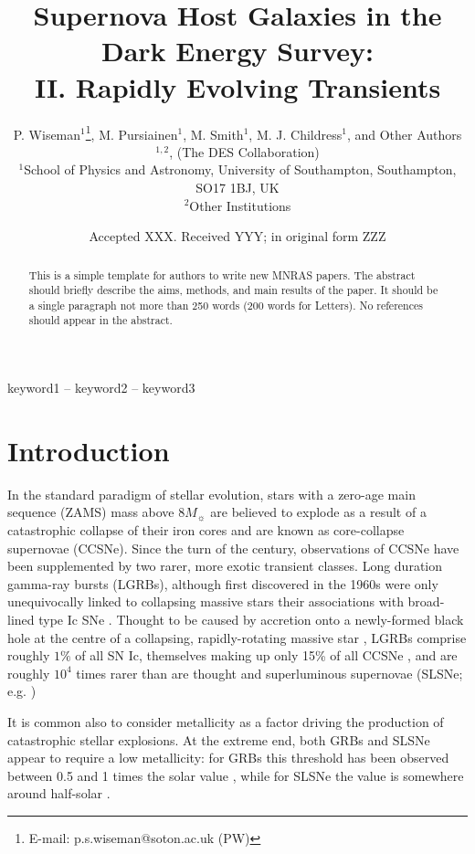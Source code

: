 \documentclass[fleqn,usenatbib,]{mnras}
\title[Supernova hosts in DES]{Supernova Host Galaxies in the Dark Energy Survey: \\ II. Rapidly Evolving Transients}
\author[P. Wiseman et al.]{
P. Wiseman$^1$\thanks{E-mail: p.s.wiseman@soton.ac.uk (PW)},
 M. Pursiainen$^1$,
 M. Smith$^1$,
 M. J. Childress$^1$,
 and Other Authors$^{1,2}$,
\newauthor
(The DES Collaboration)
\\
$^{1}$School of Physics and Astronomy, University of Southampton, Southampton, SO17 1BJ, UK\\
$^{2}$Other Institutions\\
}
\date{Accepted XXX. Received YYY; in original form ZZZ}
\begin{document}
\label{firstpage}
\pagerange{\pageref{firstpage}--\pageref{lastpage}}
\maketitle

\begin{abstract}
This is a simple template for authors to write new MNRAS papers.
The abstract should briefly describe the aims, methods, and main results of the paper.
It should be a single paragraph not more than 250 words (200 words for Letters).
No references should appear in the abstract.
\end{abstract}

\begin{keywords}
keyword1 -- keyword2 -- keyword3
\end{keywords}



\section{Introduction}



In the standard paradigm of stellar evolution, stars with a zero-age main sequence (ZAMS) mass above $8M_{\sun}$ are believed to explode as a result of a catastrophic collapse of their iron cores and are known as core-collapse supernovae (CCSNe). Since the turn of the century, observations of CCSNe have been supplemented by two rarer, more exotic transient classes. Long duration gamma-ray bursts (LGRBs), although first discovered in the 1960s \citep{Klebesadel1973} were only unequivocally linked to collapsing massive stars their associations with broad-lined type Ic SNe \citep{Galama1998,Hjorth2003}. Thought to be caused by accretion onto a newly-formed black hole at the centre of a collapsing, rapidly-rotating massive star \citep[][e.g.]{Woosley1993,Woosley2006a,Woosley2006b}, LGRBs comprise roughly $1\%$ of all SN Ic, themselves making up only 15\% of all CCSNe \citep{Kelly2012,Graham2016}, and are roughly $10^4$ times rarer than  are thought and superluminous supernovae (SLSNe; e.g. \citealt{Quimby2011, Gal-Yam2012}) 


It is common also to consider metallicity as a factor driving the production of catastrophic stellar explosions. At the extreme end, both GRBs and SLSNe appear to require a low metallicity: for GRBs this threshold has been observed between 0.5 and 1 times the solar value \citep{Perley2016b,Japelj2016,Vergani2017}, while for SLSNe the value is somewhere around half-solar \citep{Lunnan2014,Chen2016a}.
\end{document}
